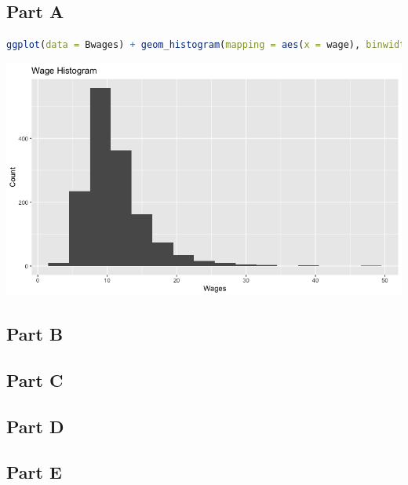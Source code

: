 \documentclass[letterpaper]{article}
\begin{document}
\subsection*{Part A}

\begin{lstlisting}[language=R]
    ggplot(data = Bwages) + geom_histogram(mapping = aes(x = wage), binwidth = 3) + xlab("Wages") + ylab("Count")
\end{lstlisting}

\begin{center}
    \includegraphics[width=6in]{wageHistogram.png}
\end{center}

\subsection*{Part B}

\subsection*{Part C}

\subsection*{Part D}

\subsection*{Part E}
\end{document}
